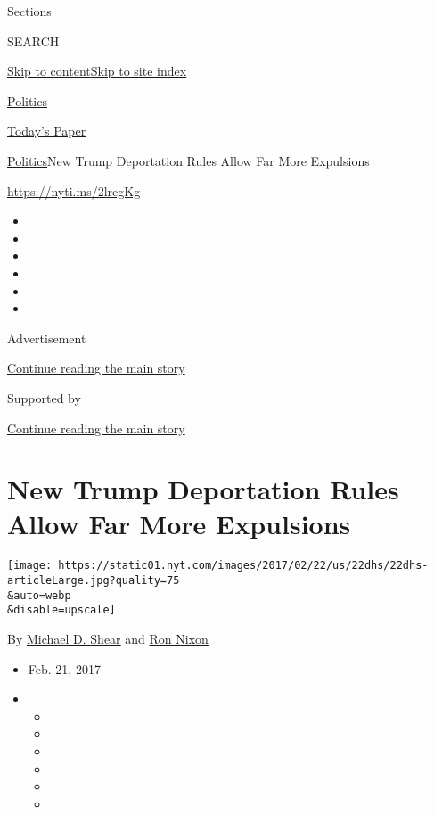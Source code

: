 Sections

SEARCH

\protect\hyperlink{site-content}{Skip to
content}\protect\hyperlink{site-index}{Skip to site index}

\href{https://www.nytimes.com/section/politics}{Politics}

\href{https://myaccount.nytimes.com/auth/login?response_type=cookie\&client_id=vi}{}

\href{https://www.nytimes.com/section/todayspaper}{Today's Paper}

\href{/section/politics}{Politics}\textbar{}New Trump Deportation Rules
Allow Far More Expulsions

\url{https://nyti.ms/2lrcgKg}

\begin{itemize}
\item
\item
\item
\item
\item
\item
\end{itemize}

Advertisement

\protect\hyperlink{after-top}{Continue reading the main story}

Supported by

\protect\hyperlink{after-sponsor}{Continue reading the main story}

\hypertarget{new-trump-deportation-rules-allow-far-more-expulsions}{%
\section{New Trump Deportation Rules Allow Far More
Expulsions}\label{new-trump-deportation-rules-allow-far-more-expulsions}}

\texttt{[image: https://static01.nyt.com/images/2017/02/22/us/22dhs/22dhs-articleLarge.jpg?quality=75\\\&auto=webp\\\&disable=upscale]}

By \href{http://www.nytimes.com/by/michael-d-shear}{Michael D. Shear}
and \href{http://www.nytimes.com/by/ron-nixon}{Ron Nixon}

\begin{itemize}
\item
  Feb. 21, 2017
\item
  \begin{itemize}
  \item
  \item
  \item
  \item
  \item
  \item
  \end{itemize}
\end{itemize}

